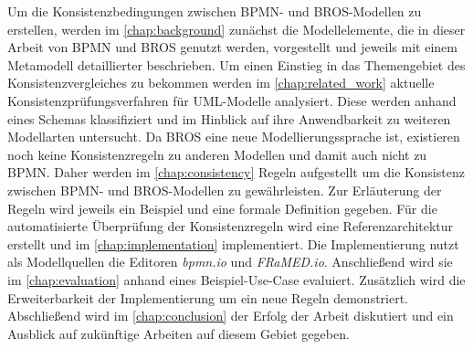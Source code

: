 Um die Konsistenzbedingungen zwischen BPMN- und BROS-Modellen zu erstellen, werden im \cref{chap:background} zunächst die Modellelemente, die in dieser Arbeit von BPMN und BROS genutzt werden, vorgestellt und jeweils mit einem Metamodell detaillierter beschrieben.
Um einen Einstieg in das Themengebiet des Konsistenzvergleiches zu bekommen werden im \cref{chap:related_work} aktuelle Konsistenzprüfungsverfahren für UML-Modelle analysiert.
Diese werden anhand eines Schemas klassifiziert und im Hinblick auf ihre Anwendbarkeit zu weiteren Modellarten untersucht.
Da BROS eine neue Modellierungssprache ist, existieren noch keine Konsistenzregeln zu anderen Modellen und damit auch nicht zu BPMN.
Daher werden im \cref{chap:consistency} Regeln aufgestellt um die Konsistenz zwischen BPMN- und BROS-Modellen zu gewährleisten.
Zur Erläuterung der Regeln wird jeweils ein Beispiel und eine formale Definition gegeben.
Für die automatisierte Überprüfung der Konsistenzregeln wird eine Referenzarchitektur erstellt und im \cref{chap:implementation} implementiert.
Die Implementierung nutzt als Modellquellen die Editoren \emph{bpmn.io} und \emph{FRaMED.io}.
Anschließend wird sie im \cref{chap:evaluation} anhand eines Beispiel-Use-Case evaluiert.
Zusätzlich wird die Erweiterbarkeit der Implementierung um ein neue Regeln demonstriert.
Abschließend wird im \cref{chap:conclusion} der Erfolg der Arbeit diskutiert und ein Ausblick auf zukünftige Arbeiten auf diesem Gebiet gegeben.
